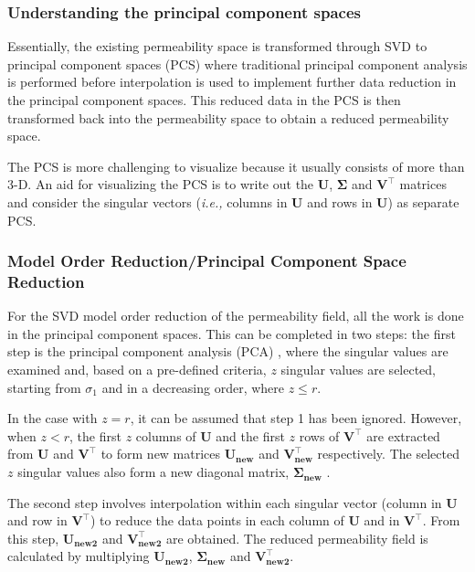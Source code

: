 \documentclass[preprint,12pt]{elsarticle}
\newcommand{\ie}{{\it i.e., }}
\begin{document}
\subsubsection{Understanding the principal component spaces}\label{subsubsection:visualization_pcspaces}
Essentially, the existing permeability space is transformed through SVD to principal component spaces (PCS) where traditional principal component analysis is performed before interpolation is used to implement further data reduction in the principal component spaces. This reduced data in the PCS is then transformed back into the permeability space to obtain a reduced permeability space.

The PCS is more challenging to visualize because it usually consists of more than 3-D. An aid for visualizing the PCS is to write out the $\mathbf{U}$, $\mathbf{\Sigma}$ and $\mathbf{V^{\intercal}}$ matrices and consider the singular vectors (\ie columns in $\mathbf{U}$ and rows in $\mathbf{U}$) as separate PCS.

\subsubsection{Model Order Reduction/Principal Component Space Reduction}\label{subsubsection:svdcase_preprocess_algorithm}
For the SVD model order reduction of the permeability field, all the work is done in the principal component spaces. This can be completed in two steps: the first step is the principal component analysis (PCA) \cite{Hotelling_1933}, where the singular values are examined and, based on a pre-defined criteria, $z$ singular values are selected, starting from $\sigma_{1}$ and in a decreasing order, where $z \leq r$.

In the case with $z = r$, it can be assumed that step 1 has been ignored. However, when $z < r$, the first $z$ columns of $\mathbf{U}$ and the first $z$ rows of $\mathbf{V^{\intercal}}$ are extracted from $\mathbf{U}$ and $\mathbf{V^{\intercal}}$ to form new matrices $\mathbf{U_{new}}$ and $\mathbf{V^{\intercal}_{new}}$ respectively. The selected $z$ singular values also form a new diagonal matrix, $\mathbf{\Sigma_{new}}$ .

The second step involves interpolation within each singular vector (column in $\mathbf{U}$ and row in $\mathbf{V^{\intercal}}$) to reduce the data points in each column of  $\mathbf{U}$ and in $\mathbf{V^{\intercal}}$. From this step,  $\mathbf{U_{new2}}$ and $\mathbf{V^{\intercal}_{new2}}$ are obtained. The reduced permeability field is calculated by multiplying  $\mathbf{U_{new2}}$, $\mathbf{\Sigma_{new}}$ and $\mathbf{V^{\intercal}_{new2}}$. 
\end{document}
